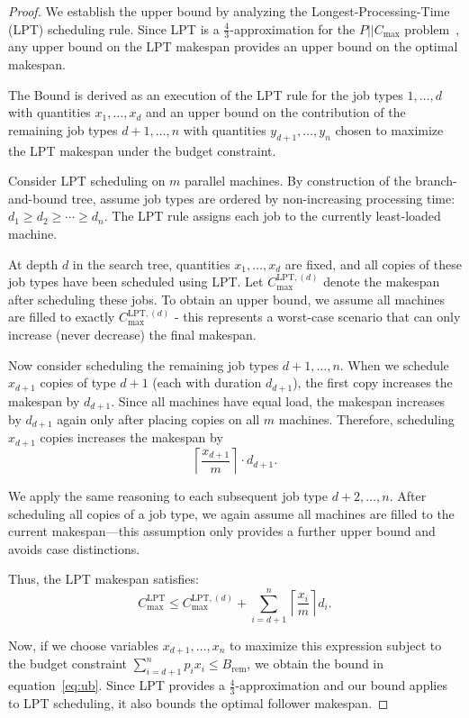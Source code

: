 \begin{proof}
We establish the upper bound by analyzing the Longest-Processing-Time (LPT) scheduling rule. Since LPT is a $\frac{4}{3}$-approximation for the $P||C_{\max}$ problem~\cite{graham1969bounds}, any upper bound on the LPT makespan provides an upper bound on the optimal makespan.

The Bound is derived as an execution of the LPT rule for the job types $1, \ldots, d$ with quantities $x_1, \ldots, x_d$ and an upper bound on the contribution of the remaining job types $d+1, \ldots, n$ with quantities $y_{d+1}, \ldots, y_n$ chosen to maximize the LPT makespan under the budget constraint.

Consider LPT scheduling on $m$ parallel machines. 
By construction of the branch-and-bound tree, assume job types are ordered by non-increasing processing time: \\
 $d_1 \geq d_2 \geq \cdots \geq d_n$. The LPT rule assigns each job to the currently least-loaded machine.

At depth $d$ in the search tree, quantities $x_1, \ldots, x_d$ are fixed, and all copies of these job types have been scheduled using LPT. 
Let $C_{\max}^{\text{LPT},(d)}$ denote the makespan after scheduling these jobs. 
To obtain an upper bound, we assume all machines are filled to exactly $C_{\max}^{\text{LPT},(d)}$ - this represents a worst-case scenario that can only increase (never decrease) the final makespan.

Now consider scheduling the remaining job types $d+1, \ldots, n$. When we schedule $x_{d+1}$ copies of type $d+1$ (each with duration $d_{d+1}$), the first copy increases the makespan by $d_{d+1}$. Since all machines have equal load, the makespan increases by $d_{d+1}$ again only after placing copies on all $m$ machines. Therefore, scheduling $x_{d+1}$ copies increases the makespan by
\begin{equation}
\left\lceil \frac{x_{d+1}}{m} \right\rceil \cdot d_{d+1}.
\end{equation}

We apply the same reasoning to each subsequent job type $d+2, \ldots, n$. After scheduling all copies of a job type, we again assume all machines are filled to the current makespan—this assumption only provides a further upper bound and avoids case distinctions.

Thus, the LPT makespan satisfies:
\begin{equation}
C_{\max}^{\text{LPT}} \leq C_{\max}^{\text{LPT},(d)} + \sum_{i=d+1}^{n} \left\lceil \frac{x_i}{m} \right\rceil d_i.
\end{equation}

Now, if we choose variables $x_{d+1}, \ldots, x_n$ to maximize this expression subject to the budget constraint $\sum_{i=d+1}^{n} p_i x_i \leq B_{\text{rem}}$, we obtain the bound in equation~\eqref{eq:ub}. Since LPT provides a $\frac{4}{3}$-approximation and our bound applies to LPT scheduling, it also bounds the optimal follower makespan.
\end{proof}

